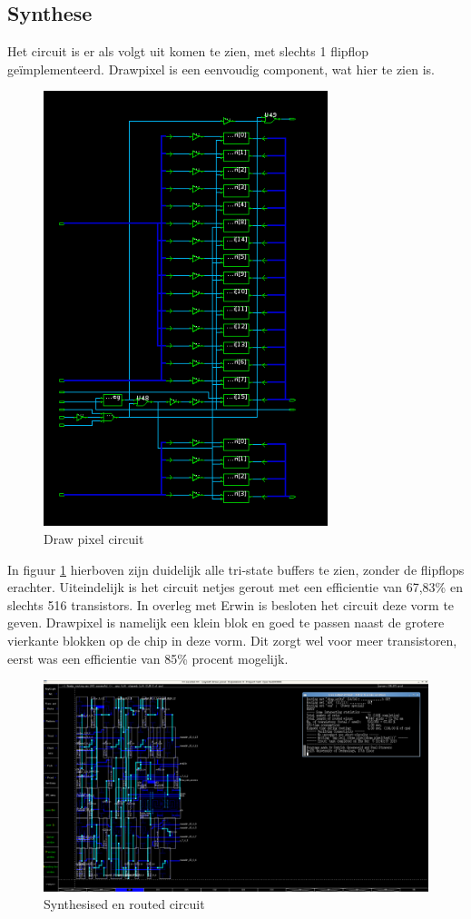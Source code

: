 \documentclass{scrartcl} %
\begin{document}
\subsection{Synthese}
Het circuit is er als volgt uit komen te zien, met slechts 1 flipflop geïmplementeerd. Drawpixel is een eenvoudig component, wat hier te zien is. 
\begin{figure} [h!]
\centering
\includegraphics [scale = 0.8] {resource/dp_circ}
\caption{Draw pixel circuit}
\label{fig:dpcircuit}
\end{figure}

\newpage 

In figuur \ref{fig:dpcircuit} hierboven zijn duidelijk alle tri-state buffers te zien, zonder de flipflops erachter. Uiteindelijk is het circuit netjes gerout met een efficientie van 67,83\% en slechts 516 transistors. In overleg met Erwin is besloten het circuit deze vorm te geven. Drawpixel is namelijk een klein blok en goed te passen naast de grotere vierkante blokken op de chip in deze vorm. Dit zorgt wel voor meer transistoren, eerst was een efficientie van 85\% procent mogelijk. 
\begin{figure} [h!]
\includegraphics [width = \textwidth] {resource/dp_trout}
\caption{Synthesised en routed circuit}
\label{fig:dplayout}
\end{figure}
\end{document}
